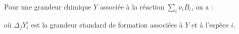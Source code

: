 ﻿\documentclass[a4paper]{article}
\begin{document}
\pagestyle{fancy}
\fancyhf{}
\setlength{\headheight}{15pt}

\begin{center}
	\large{}
\end{center}


Pour une grandeur chimique \(Y\) associée à la réaction \(\sum_i\nu_iB_i\), on a :
\begin{center}\end{center}où \(\Delta_fY_i^{\circ}\) est la grandeur standard de formation associées à \(Y\) et à l'espèce \(i\).
\end{document}
